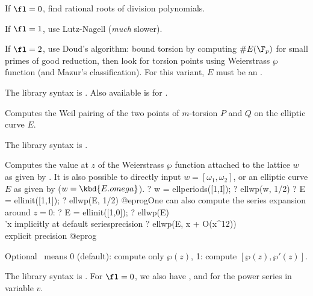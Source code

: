 If $\fl = 0$, find rational roots of division polynomials.

If $\fl = 1$, use Lutz-Nagell (\emph{much} slower).

If $\fl = 2$, use Doud's algorithm: bound torsion by computing $\#E(\F_p)$
for small primes of good reduction, then look for torsion points using
Weierstrass $\wp$ function (and Mazur's classification). For this variant,
$E$ must be an .

The library syntax is .
Also available is  for .

\label{se:ellweilpairing}
Computes the Weil pairing of the two points of $m$-torsion $P$ and $Q$
on the elliptic curve $E$.

The library syntax is .

\label{se:ellwp}
Computes the value at $z$ of the Weierstrass $\wp$ function attached to
the lattice $w$ as given by . It is also possible to
directly input $w = [\omega_1,\omega_2]$, or an elliptic curve $E$ as given
by  ($w = \kbd{E.omega}$).
\bprog
? w = ellperiods([1,I]);
? ellwp(w, 1/2)
? E = ellinit([1,1]);
? ellwp(E, 1/2)
@eprog\noindent One can also compute the series expansion around $z = 0$:
\bprog
? E = ellinit([1,0]);
? ellwp(E)              \\ 'x implicitly at default seriesprecision
? ellwp(E, x + O(x^12)) \\ explicit precision
@eprog

Optional \fl\ means 0 (default): compute only $\wp(z)$, 1: compute
$[\wp(z),\wp'(z)]$.

The library syntax is .
For $\fl = 0$, we also have
, and
 for the power series in
variable $v$.

